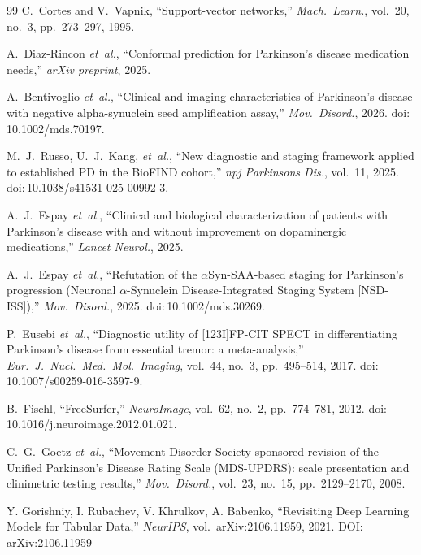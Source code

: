 \documentclass[10pt,letterpaper]{article}
\begin{document}
\begin{thebibliography}{99}
C.~Cortes and V.~Vapnik, ``Support-vector networks,'' \textit{Mach.\ Learn.}, vol.~20, no.~3, pp.~273--297, 1995.

A.~Diaz-Rincon \textit{et~al.}, ``Conformal prediction for Parkinson's disease medication needs,'' \textit{arXiv preprint}, 2025.

A.~Bentivoglio \textit{et~al.}, ``Clinical and imaging characteristics of Parkinson's disease with negative alpha-synuclein seed amplification assay,'' \textit{Mov.\ Disord.}, 2026. doi:\,10.1002/mds.70197.

M.~J.~Russo, U.~J.~Kang, \textit{et~al.}, ``New diagnostic and staging framework applied to established PD in the BioFIND cohort,'' \textit{npj Parkinsons Dis.}, vol.~11, 2025. doi:\,10.1038/s41531-025-00992-3.

A.~J.~Espay \textit{et~al.}, ``Clinical and biological characterization of patients with Parkinson's disease with and without improvement on dopaminergic medications,'' \textit{Lancet Neurol.}, 2025.

A.~J.~Espay \textit{et~al.}, ``Refutation of the $\alpha$Syn-SAA-based staging for Parkinson's progression (Neuronal $\alpha$-Synuclein Disease-Integrated Staging System [NSD-ISS]),'' \textit{Mov.\ Disord.}, 2025. doi:\,10.1002/mds.30269.

P.~Eusebi \textit{et~al.}, ``Diagnostic utility of [123I]FP-CIT SPECT in differentiating Parkinson's disease from essential tremor: a meta-analysis,'' \textit{Eur.\ J.\ Nucl.\ Med.\ Mol.\ Imaging}, vol.~44, no.~3, pp.~495--514, 2017. doi:\,10.1007/s00259-016-3597-9.

B.~Fischl, ``FreeSurfer,'' \textit{NeuroImage}, vol.~62, no.~2, pp.~774--781, 2012. doi:\,10.1016/j.neuroimage.2012.01.021.

C.~G.~Goetz \textit{et~al.}, ``Movement Disorder Society-sponsored revision of the Unified Parkinson's Disease Rating Scale (MDS-UPDRS): scale presentation and clinimetric testing results,'' \textit{Mov.\ Disord.}, vol.~23, no.~15, pp.~2129--2170, 2008.

Y. Gorishniy, I. Rubachev, V. Khrulkov, A. Babenko,
``Revisiting Deep Learning Models for Tabular Data,''
\textit{NeurIPS}, vol.~arXiv:2106.11959, 2021. DOI: \href{https://arxiv.org/abs/2106.11959}{arXiv:2106.11959}


\end{thebibliography}
\end{document}

